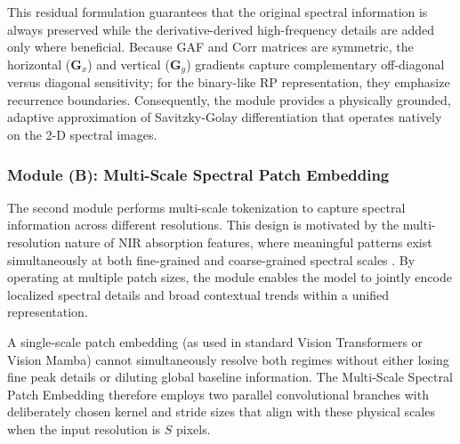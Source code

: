 \documentclass[pdflatex,sn-mathphys-num]{sn-jnl}%
\begin{document}
This residual formulation guarantees that the original spectral information is always preserved while the derivative-derived high-frequency details are added only where beneficial. Because GAF and Corr matrices are symmetric, the horizontal ($\mathbf{G}_x$) and vertical ($\mathbf{G}_y$) gradients capture complementary off-diagonal versus diagonal sensitivity; for the binary-like RP representation, they emphasize recurrence boundaries. Consequently, the module provides a physically grounded, adaptive approximation of Savitzky-Golay differentiation that operates natively on the 2-D spectral images.

\subsubsection{Module (B): Multi-Scale Spectral Patch Embedding}
The second module performs multi-scale tokenization to capture spectral information across different resolutions. This design is motivated by the multi-resolution nature of NIR absorption features, where meaningful patterns exist simultaneously at both fine-grained and coarse-grained spectral scales \cite{weyer2002spectra, bec2021spectra}. By operating at multiple patch sizes, the module enables the model to jointly encode localized spectral details and broad contextual trends within a unified representation. 

A single-scale patch embedding (as used in standard Vision Transformers or Vision Mamba) cannot simultaneously resolve both regimes without either losing fine peak details or diluting global baseline information. The Multi-Scale Spectral Patch Embedding therefore employs two parallel convolutional branches with deliberately chosen kernel and stride sizes that align with these physical scales when the input resolution is $S$ pixels.
\end{document}

